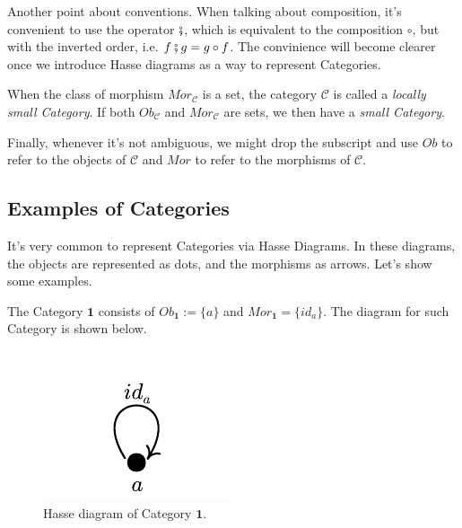 Another point about conventions. When talking about composition, it's convenient
to use the operator $\fatsemi$, which is equivalent to the composition $\circ$,
but with the inverted order, i.e. $f \fatsemi g = g \circ f$. The convinience
will become clearer once we introduce Hasse diagrams as a way to represent Categories.

When the class of morphism $Mor_\mathcal C$ is a set, the category $\mathcal C$ is called
a \textit{locally small Category}. If both $Ob_\mathcal C$ and $Mor_\mathcal C$ are sets,
we then have a \textit{small Category}.

Finally, whenever it's not ambiguous, we might drop the subscript and use $Ob$
to refer to the objects of $\mathcal C$ and $Mor$ to refer to the morphisms of $\mathcal C$.

\subsection{Examples of Categories}

It's very common to represent Categories via Hasse Diagrams. In these diagrams, the
objects are represented as dots, and the morphisms as arrows. Let's show some examples.

\begin{example}[Category $\bm 1$]
  The Category $\bm 1$ consists of $Ob_{\bm 1} := \{a\}$ and $Mor_{\bm 1} = \{id_a\}$.
  The diagram for such Category is shown below.
  \begin{figure}[H]
    \begin{center}
      \includegraphics{./notebooks/1Cat}
    \end{center}
    \caption{Hasse diagram of Category $\bm 1$.}
    \label{fig:1Cat}
  \end{figure}
\end{example}

